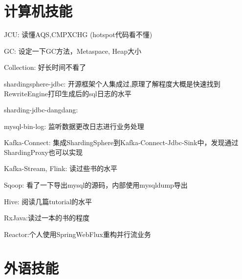 \documentclass[12pt, a4paper, roman]{moderncv}
\begin{document}
\section{计算机技能}

 {
  \begin{compactitem}
    \item JCU: 读懂AQS,CMPXCHG (hotspot代码看不懂)
    \item GC: 设定一下GC方法，Metaspace, Heap大小
    \item Collection: 好长时间不看了
  \end{compactitem}
 }
 {
  \begin{compactitem}
    \item shardingsphere-jdbc: 开源框架个人集成过,原理了解程度大概是快速找到RewriteEngine打印生成后的sql日志的水平
    \item sharding-jdbc-dangdang: 
    \item mysql-bin-log: 监听数据更改日志进行业务处理
  \end{compactitem}
}
 {
  \begin{compactitem}
    \item Kafka-Connect: 集成ShardingSphere到Kafka-Connect-Jdbc-Sink中，发现通过ShardingProxy也可以实现
    \item Kafka-Stream, Flink:  读过些书的水平
    \item Sqoop: 看了一下导出mysql的源码，内部使用mysqldump导出
    \item Hive:  阅读几篇tutorial的水平
  \end{compactitem}
}
 {
  \begin{compactitem}
    \item RxJava:读过一本的书的程度
    \item Reactor:个人使用SpringWebFlux重构并行流业务
  \end{compactitem}
}


\section{外语技能}
\end{document}
